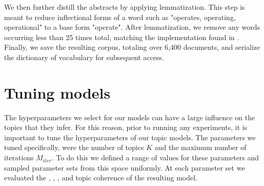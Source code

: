 
We then further distill the abstracts by applying lemmatization. This step is meant to reduce inflectional forms of a word such as "operates, operating, operational" to a base form "operate". After lemmatization, we remove any words occurring less than 25 times total, matching the implementation found in \parencite{Blei:2006:DTM:1143844.1143859}. Finally, we save the resulting corpus, totaling over 6,400 documents, and serialize the dictionary of vocabulary for subsequent access.



\section{Tuning models}
\label{tuning}
The hyperparameters we select for our models can have a large influence on the topics that they infer. For this reason, prior to running any experiments, it is important to tune the hyperparameters of our topic models. The parameters we tuned specifically, were the number of topics $K$ and the maximum number of iterations $M_{iter}$. To do this we defined a range of values for these parameters and sampled parameter sets from this space uniformly. At each parameter set we evaluated the , , , and  topic coherence of the resulting model. 

